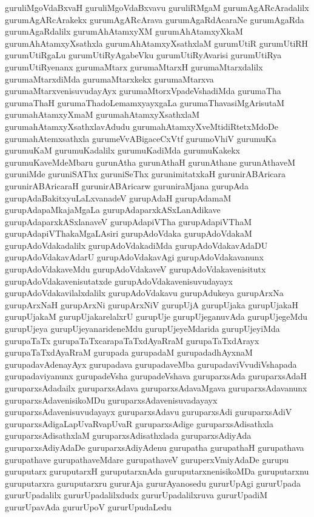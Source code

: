 {guruliMgoVdaBxvaH
guruliMgoVdaBxvavu
guruliRMgaM
gurumAgARcAradalilx
gurumAgARcArakekx
gurumAgARcArava
gurumAgaRdAcaraNe
gurumAgaRda
gurumAgaRdalilx
gurumAhAtamxyXM
gurumAhAtamxyXkaM
gurumAhAtamxyXsathxla
gurumAhAtamxyXsathxlaM
gurumUtiR
gurumUtiRH
gurumUtiRgaLu
gurumUtiRyAgabeVku
gurumUtiRyAvarisi
gurumUtiRya
gurumUtiRyenanx
gurumaMtarx
gurumaMtarxH
gurumaMtarxdalilx
gurumaMtarxdiMda
gurumaMtarxkekx
gurumaMtarxva
gurumaMtarxvenisuvudayAyx
gurumaMtorxVpadeVshadiMda
gurumaTha
gurumaThaH
gurumaThadoLemamxyayxgaLa
gurumaThavasiMgArisutaM
gurumahAtamxyXmaM
gurumahAtamxyXsathxlaM
gurumahAtamxyXsathxlavAdudu
gurumahAtamxyXveMtidiRtetxMdoDe
gurumahAtemxsathxla
gurumeVvABigaceCxVtf
gurumoVhiV
gurumuKa
gurumuKaM
gurumuKadalilx
gurumuKadiMda
gurumuKakekx
gurumuKaveMdeMbaru
gurunAtha
gurunAthaH
gurunAthane
gurunAthaveM
guruniMde
guruniSAThx
guruniSeThx
gurunimitatxkaH
gurunirABAricara
gurunirABAricaraH
gurunirABAricarw
guruniraMjana
gurupAda
gurupAdaBakitxyuLaLxvanadeV
gurupAdaH
gurupAdamaM
gurupAdapaMkajaMgaLa
gurupAdaparxkASxLanAdikave
gurupAdaparxkASxlanaveV
gurupAdapiVTha
gurupAdapiVThaM
gurupAdapiVThakaMgaLAsiri
gurupAdoVdaka
gurupAdoVdakaM
gurupAdoVdakadalilx
gurupAdoVdakadiMda
gurupAdoVdakavAdaDU
gurupAdoVdakavAdarU
gurupAdoVdakavAgi
gurupAdoVdakavanunx
gurupAdoVdakaveMdu
gurupAdoVdakaveV
gurupAdoVdakavenisitutx
gurupAdoVdakavenisutatxde
gurupAdoVdakavenisuvudayayx
gurupAdoVdakavilalxdalilx
gurupAdoVdakavu
gurupAdukeya
gurupArxNa
gurupArxNaH
gurupArxNi
gurupArxNiV
gurupUjA
gurupUjaka
gurupUjakaH
gurupUjakaM
gurupUjakarelalxrU
gurupUje
gurupUjeganuvAda
gurupUjegeMdu
gurupUjeya
gurupUjeyanarideneMdu
gurupUjeyeMdarida
gurupUjeyiMda
gurupaTaTx
gurupaTaTxcarapaTaTxdAyaRraM
gurupaTaTxdArayx
gurupaTaTxdAyaRraM
gurupada
gurupadaM
gurupadadhAyxnaM
gurupadavAdenayAyx
gurupadava
gurupadaveMba
gurupadaviVvudiVshapada
gurupadaviyanunx
gurupadeVsha
gurupadeVshava
guruparxsAda
guruparxsAdaH
guruparxsAdadailx
guruparxsAdava
guruparxsAdavaMgava
guruparxsAdavanunx
guruparxsAdavenisikoMDu
guruparxsAdavenisuvadayayx
guruparxsAdavenisuvudayayx
guruparxsAdavu
guruparxsAdi
guruparxsAdiV
guruparxsAdigaLapUvaRvapUvaR
guruparxsAdige
guruparxsAdisathxla
guruparxsAdisathxlaM
guruparxsAdisathxlada
guruparxsAdiyAda
guruparxsAdiyAdaDe
guruparxsAdiyAdenu
gurupatha
gurupathaH
gurupathava
gurupathave
gurupathaveMdare
gurupathaveV
guruperxVmiyAdaDe
gurupu
guruputarx
guruputarxH
guruputarxnAda
guruputarxnenisikoMDa
guruputarxnu
guruputarxra
guruputarxru
gururAja
gururAyanosedu
gururUpAgi
gururUpada
gururUpadalilx
gururUpadalilxdudx
gururUpadalilxruva
gururUpadiM
gururUpavAda
gururUpoV
gururUpudaLedu
}
